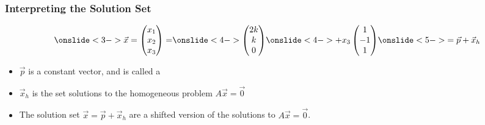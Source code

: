 \begin{frame}
\frametitle{Interpreting the Solution Set}
\begin{align*}
    \onslide<3->{\vec{x} 
        = \begin{pmatrix} x_1\\x_2\\x_3 \end{pmatrix} 
         = }
         \onslide<4->{\begin{pmatrix} 2k \\ k \\ 0 \end{pmatrix}}
        \onslide<4->{+ x_3 \begin{pmatrix} 1 \\ -1 \\ 1 \end{pmatrix}}
        \onslide<5->{=\vec p + \vec x_h}
\end{align*}
\begin{itemize}
    \item<7->$\vec p$ is a constant vector, and is called a  
    \item<8->$\vec x_h$ is the set solutions to the homogeneous problem $A\vec x = \vec 0$
    \item<9-> The solution set $\vec x = \vec p + \vec x_h$ are a shifted version of the solutions to $A\vec x = \vec 0$. 
\end{itemize}
    
\end{frame}



